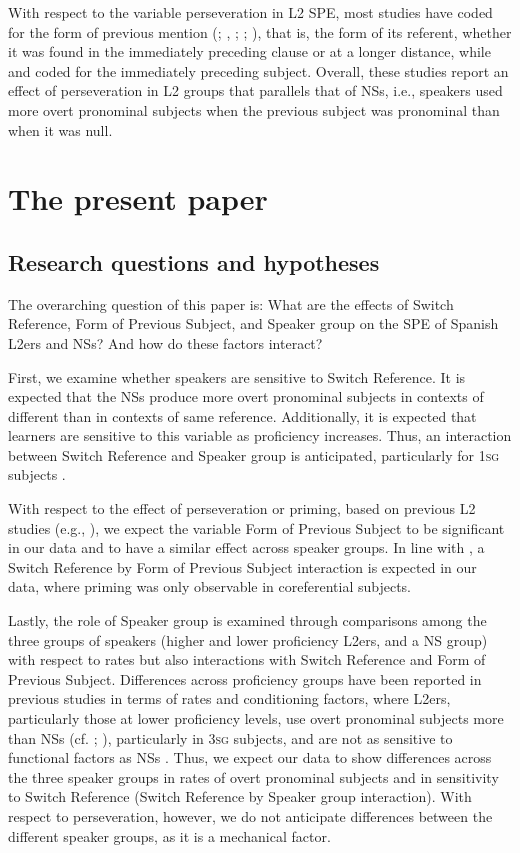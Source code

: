 \documentclass[output=paper,colorlinks,citecolor=brown,draftmode]{langscibook}
\begin{document}
With respect to the variable perseveration in L2 SPE, most studies have coded for the form of previous mention (\citealp{Abreu2009}; \citealp{GeeslinGudmestad2011}, \citeyear{GeeslinGudmestad2016}; \citealp{GudmestadGeeslin2013}; \citealp{Long2016}), that is, the form of its referent, whether it was found in the immediately preceding clause or at a longer distance, while \citet{Linford2016} and \citet{Zahler2018} coded for the immediately preceding subject. Overall, these studies report an effect of perseveration in L2 groups that parallels that of NSs, i.e., speakers used more overt pronominal subjects when the previous subject was pronominal than when it was null.

\section{The present paper}
\subsection{Research questions and hypotheses}
\largerpage
The overarching question of this paper is: What are the effects of Switch Reference, Form of Previous Subject, and Speaker group on the SPE of Spanish L2ers and NSs? And how do these factors interact?

First, we examine whether speakers are sensitive to Switch Reference. It is expected that the NSs produce more overt pronominal subjects in contexts of different than in contexts of same reference. Additionally, it is expected that learners are sensitive to this variable as proficiency increases. Thus, an interaction between Switch Reference and Speaker group is anticipated, particularly for 1\textsc{sg} subjects \citep{PradaPérezFeroce2020}.

With respect to the effect of perseveration or priming, based on previous L2 studies (e.g., \citealp{Abreu2009}), we expect the variable Form of Previous Subject to be significant in our data and to have a similar effect across speaker groups. In line with \citet{Cameron1994}, a Switch Reference by Form of Previous Subject interaction is expected in our data, where priming was only observable in coreferential subjects.

Lastly, the role of Speaker group is examined through comparisons among the three groups of speakers (higher and lower proficiency L2ers, and a NS group) with respect to rates but also interactions with Switch Reference and Form of Previous Subject. Differences across proficiency groups have been reported in previous studies in terms of rates and conditioning factors, where L2ers, particularly those at lower proficiency levels, use overt pronominal subjects more than NSs (cf. \citealp{GeeslinDíaz-Campos2013}; \citealp{GeeslinFafulas2015}), particularly in 3\textsc{sg} subjects, and are not as sensitive to functional factors as NSs \citep{PradaPérezFeroce2020}. Thus, we expect our data to show differences across the three speaker groups in rates of overt pronominal subjects and in sensitivity to Switch Reference (Switch Reference by Speaker group interaction). With respect to perseveration, however, we do not anticipate differences between the different speaker groups, as it is a mechanical factor.
\end{document}
